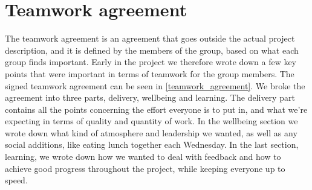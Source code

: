 \section{Teamwork agreement}
The teamwork agreement is an agreement that goes outside the actual project description, and it is defined by the members of the group, based on what each group finds important. Early in the project we therefore wrote down a few key points that were important in terms of teamwork for the group members. The signed teamwork agreement can be seen in \autoref{teamwork_agreement}. We broke the agreement into three parts, delivery, wellbeing and learning. The delivery part contains all the points concerning the effort everyone is to put in, and what we're expecting in terms of quality and quantity of work. In the wellbeing section we wrote down what kind of atmosphere and leadership we wanted, as well as any social additions, like eating lunch together each Wednesday. In the last section, learning, we wrote down how we wanted to deal with feedback and how to achieve good progress throughout the project, while keeping everyone up to speed.

